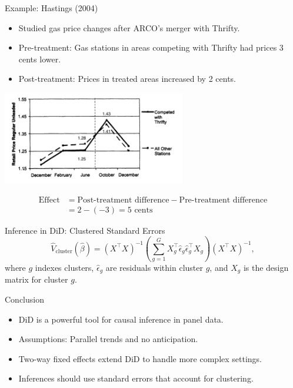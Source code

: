 \documentclass[xcolor=svgnames,t]{beamer}
\begin{document}
    \begin{frame}{Example: Hastings (2004)}
    \begin{itemize}
        \item Studied gas price changes after ARCO's merger with Thrifty.
        \item Pre-treatment: Gas stations in areas competing with Thrifty had prices 3 cents lower.
        \item Post-treatment: Prices in treated areas increased by 2 cents.
    \end{itemize}
    \centering
    \pause
    \includegraphics[width=0.6\textwidth]{Figures/hastings_example.png}
    \pause
    
    \begin{align*}
    \text{Effect} &= \text{Post-treatment difference} - \text{Pre-treatment difference} \\
        &= 2 - (-3) = 5 \text{ cents}
    \end{align*}
    
    
    \end{frame}
    \begin{frame}{Inference in DiD: Clustered Standard Errors}
        \small
        \[
        \widehat{V}_{\text{cluster}}(\hat{\beta}) 
        = (X^{\top}X)^{-1}\left(\sum_{g=1}^{G}X_{g}^{\top}\widehat{\epsilon}_{g}\widehat{\epsilon}_{g}^{\top}X_{g}\right)(X^{\top}X)^{-1},
        \]
        where $g$ indexes clusters, $\widehat{\epsilon}_{g}$ are residuals within cluster $g$, and $X_{g}$ is the design matrix for cluster $g$.
        \end{frame}
        
    \begin{frame}{Conclusion}
    \begin{itemize}
        \item DiD is a powerful tool for causal inference in panel data.
        \pause
        \item Assumptions: Parallel trends and no anticipation.
        \pause
        \item Two-way fixed effects extend DiD to handle more complex settings.
        \pause
        \item Inferences should use standard errors that account for clustering.
    \end{itemize}
    \end{frame}
\end{document}
